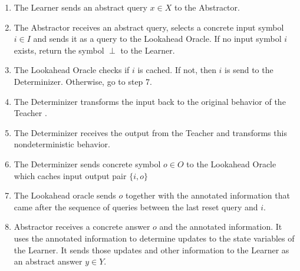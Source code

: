 \documentclass[multi,crop=false,class=article]{standalone}
\begin{document}
\begin{enumerate}
	\item The Learner sends an abstract query $x \in X$ to the Abstractor.
	\item The Abstractor receives an abstract query, selects a concrete input
	symbol $i \in I$ and sends it as a query to the Lookahead 
	Oracle\cite{Tomte2014}. If no input symbol $i$ exists, return the symbol 
	$\perp$ to the Learner.
	\item The Lookahead Oracle checks if $i$ is cached. If not, then $i$ is send
	to the Determinizer. Otherwise, go to step 7.
	\item The Determinizer transforms the input back to the original behavior of
	the Teacher \cite{Aarts2015}.
	\item The Determinizer receives the output from the Teacher and transforms 
	this nondeterministic behavior.
	\item The Determinizer sends concrete symbol $o \in O$ to the Lookahead 
	Oracle which caches input output pair $\{i,o\}$
	\item The Lookahead oracle sends $o$ together with the annotated information
	that came after the sequence of queries between the last reset query and
	$i$.
	\item Abstractor receives a concrete answer $o$ and the annotated
	information. It uses the annotated information to determine updates to the
	state variables of the Learner. It sends those updates and other
	information to the Learner as an abstract answer $y \in Y$.
\end{enumerate}
\end{document}
